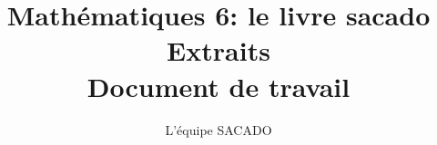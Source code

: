 





\title{Mathématiques 6\ieme : le livre sacado \\ Extraits\\ Document de travail}
\author{L'équipe SACADO}



\parindent=0pt

\maketitle


%
 


